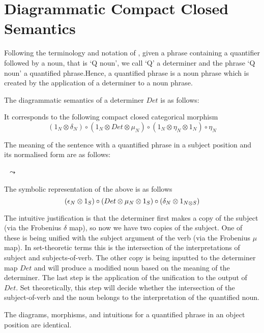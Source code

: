 \section{Diagrammatic  Compact Closed Semantics}


Following the terminology and notation of \cite{BarwiseCooper81}, given a phrase containing a quantifier followed by a noun, that is `Q noun', we call `Q' a determiner and the phrase `Q noun' a quantified  phrase.Hence,  a quantified phrase is a noun phrase which is created by the application of a determiner to a noun phrase.  


The diagrammatic semantics of a determiner $Det$ is as follows:

\begin{center}
\end{center}

\noindent
It corresponds to the following compact closed categorical morphism
{\small
\[
(1_N \otimes \delta_N) \circ (1_N \otimes Det \otimes \mu_N) \circ (1_N \otimes \eta_N \otimes 1_N) \circ \eta_N 
\]}

\noindent
The meaning of the sentence with a quantified phrase in a subject position and its normalised form are as follows:


\begin{minipage}{20cm}
\begin{minipage}{7cm}
\end{minipage}
\ $\leadsto$ \
\begin{minipage}{5cm}
\end{minipage}
\end{minipage}


\noindent
The symbolic representation of the above is as follows
\[{\small
(\epsilon_N \otimes 1_S) \circ (Det \otimes  \mu_N \otimes 1_S) \circ (\delta_N \otimes 1_{N \otimes S})}
\]


The intuitive justification  is that the determiner first makes a copy of the subject (via the Frobenius $\delta$ map), so now we have two copies of the subject. One of these is being unified with the subject argument of the verb (via the Frobenius $\mu$ map). In set-theoretic terms this is the intersection of the interpretations of subject and subjects-of-verb. The other copy is being inputted to the determiner map $Det$ and will produce a modified noun based on the meaning of the determiner.  The last step is the application of the unification to the output of $Det$. Set theoretically, this step will decide whether the intersection of the subject-of-verb and the noun belongs to the interpretation of the quantified noun. 

 
The diagrams,  morphisms, and intuitions for a quantified phrase in an object position are identical.

